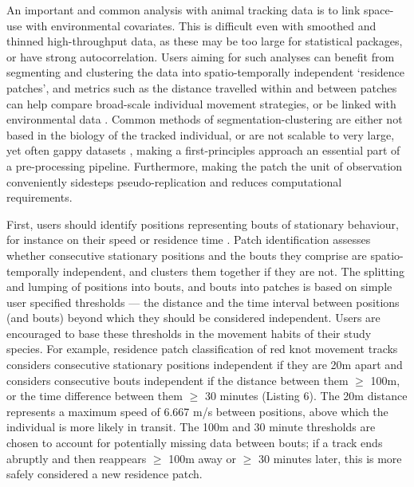 \documentclass[10pt,paper=a4,headings=standardclasses
]{scrartcl}
\begin{document}
An important and common analysis with animal tracking data is to link space-use with environmental covariates.
This is difficult even with smoothed and thinned high-throughput data, as these may be too large for statistical packages, or have strong autocorrelation.
Users aiming for such analyses can benefit from segmenting and clustering the data into spatio-temporally independent `residence patches', and metrics such as the distance travelled within and between patches can help compare broad-scale individual movement strategies, or be linked with environmental data \citep{bijleveld2016, oudman2018, barraquand2008}.
Common methods of segmentation-clustering are either not based in the biology of the tracked individual, or are not scalable to very large, yet often gappy datasets \citep{patin2020a}, making a first-principles approach an essential part of a pre-processing pipeline.
Furthermore, making the patch the unit of observation conveniently sidesteps pseudo-replication and reduces computational requirements.

First, users should identify positions representing bouts of stationary behaviour, for instance on their speed or residence time \citep{bracis2018}.
Patch identification assesses whether consecutive stationary positions and the bouts they comprise are spatio-temporally independent, and clusters them together if they are not.
The splitting and lumping of positions into bouts, and bouts into patches is based on simple user specified thresholds --- the distance and the time interval between positions (and bouts) beyond which they should be considered independent.
Users are encouraged to base these thresholds in the movement habits of their study species.
For example, residence patch classification of red knot movement tracks considers consecutive stationary positions independent if they are 20m apart and considers consecutive bouts independent if the distance between them $\geq$ 100m, or the time difference between them $\geq$ 30 minutes (Listing 6).
The 20m distance represents a maximum speed of 6.667 m/s between positions, above which the individual is more likely in transit.
The 100m and 30 minute thresholds are chosen to account for potentially missing data between bouts; if a track ends abruptly and then reappears $\geq$ 100m away or $\geq$ 30 minutes later, this is more safely considered a new residence patch.
\end{document}
